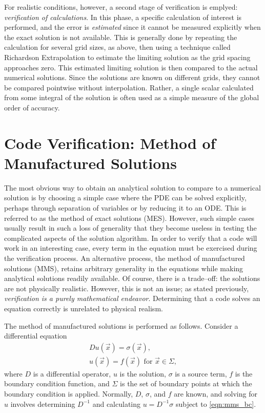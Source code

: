 For realistic conditions, however, a second stage of verification is emplyed: \textit{verification of calculations}.
In this phase, a specific calculation of interest is performed, and the error is \textit{estimated} since it cannot be measured explicitly when the exact solution is not available.
This is generally done by repeating the calculation for several grid sizes, as above, then using a technique called Richardson Extrapolation to estimate the limiting solution as the grid spacing approaches zero.
This estimated limiting solution is then compared to the actual numerical solutions.
Since the solutions are known on different grids, they cannot be compared pointwise without interpolation.
Rather, a single scalar calculated from some integral of the solution is often used as a simple measure of the global order of accuracy. %

\section{Code Verification: Method of Manufactured Solutions}

The most obvious way to obtain an analytical solution to compare to a numerical solution is by choosing a simple case where the PDE can be solved explicitly, perhaps through separation of variables or by reducing it to an ODE.
This is referred to as the method of exact solutions (MES).
However, such simple cases usually result in such a loss of generality that they become useless in testing the complicated aspects of the solution algorithm.
In order to verify that a code will work in an interesting case, every term in the equation must be exercised during the verification process.
An alternative process, the method of manufactured solutions (MMS), retains arbitrary generality in the equations while making analytical solutions readily available.
Of course, there is a trade--off: the solutions are not physically realistic.
However, this is not an issue; as stated previously, \textit{verification is a purely mathematical endeavor}.
Determining that a code solves an equation correctly is unrelated to physical realism.

The method of manufactured solutions is performed as follows.
Consider a differential equation
\begin{align}
  Du(\vec{x}) = \sigma(\vec{x}), \label{eqn:mms_de} \\
  u(\vec{x})=f(\vec{x}) \mbox{ for } \vec{x} \in \Sigma,
  \label{eqn:mms_bc}
\end{align}
where $D$ is a differential operator, $u$ is the solution, $\sigma$ is a source term, $f$ is the boundary condition function, and $\Sigma$ is the set of boundary points at which the boundary condition is applied.
Normally, $D$, $\sigma$, and $f$ are known, and solving for $u$ involves determining $D^{-1}$ and calculating $u = D^{-1}\sigma$ subject to \eqref{eqn:mms_bc}.

